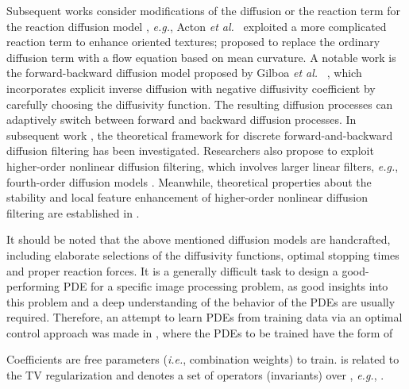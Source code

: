 \documentclass[10pt,journal,compsoc]{IEEEtran}
\newcommand{\etal}{\emph{et al.}}
\newcommand{\eg}{\emph{e.g.}}
\newcommand{\ie}{\emph{i.e.}}
\begin{document}
{Subsequent works consider modifications of the diffusion or the reaction 
term for the reaction diffusion model 
\cite{esclarin1997image, cottet1993image, acton2001oriented}, \eg, 
Acton \etal ~\cite{acton2001oriented} exploited 
a more complicated reaction term to enhance oriented 
textures; \cite{barcelos2003well} proposed 
to replace the ordinary diffusion term with a flow equation based on mean curvature. 
A notable work is the forward-backward diffusion model proposed by Gilboa \etal~ \cite{gilboa2002forward}, 
which incorporates explicit 
inverse diffusion with negative diffusivity coefficient by carefully choosing the diffusivity function. The resulting diffusion 
processes can adaptively switch between forward and backward diffusion processes. 
In subsequent work \cite{welk2009theoretical}, 
the theoretical framework for discrete forward-and-backward diffusion 
filtering has been investigated. 
Researchers also propose to exploit higher-order nonlinear diffusion filtering, which involves larger linear filters, 
\eg, fourth-order diffusion models \cite{hajiaboli2011anisotropic, didas2009properties, guidotti2011two}.
Meanwhile, theoretical properties about the stability and local feature enhancement of higher-order nonlinear diffusion filtering 
are established in \cite{didas2005stability}. 

It should be noted that the above mentioned diffusion models are 
handcrafted, including elaborate selections of the diffusivity functions, optimal stopping times and proper reaction forces. 
It is a generally difficult task to design a good-performing PDE for 
a specific image processing problem, as good insights into this problem and a deep understanding of the behavior of the PDEs are usually required. 
Therefore, an attempt to learn PDEs from training data via an 
optimal control approach was made in \cite{liu2010learning}, where 
the PDEs to be trained have the form of 
 
Coefficients  are free parameters (\ie, combination weights) 
to train.  is related to the TV regularization 
\cite{rudin1992nonlinear} and  denotes a set of 
operators (invariants) over , \eg, . 

\begin{comment}
Unfortunately, at present \cite{liu2010learning} is the sole previous work we can find in this direction. 
The basic idea of our approach is similar to \cite{liu2010learning}, but 
our proposed model will be much 
more expressive. More details are presented in Section \ref{relations}. 
\end{comment}

}
\end{document}
